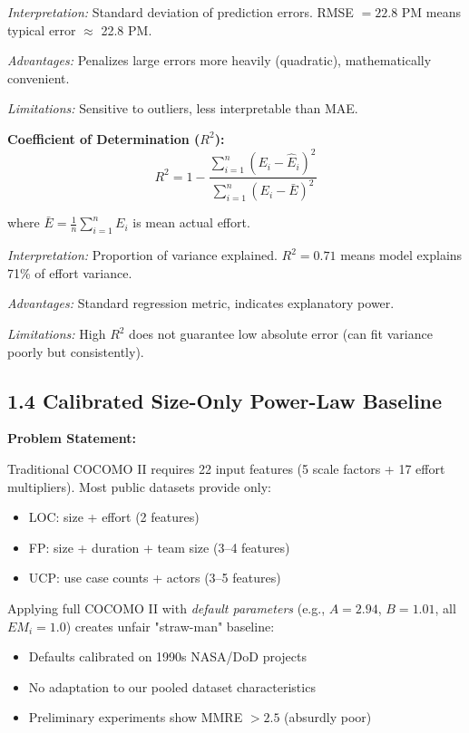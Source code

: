 \documentclass[11pt,a4paper]{article}
\begin{document}
\textit{Interpretation:} Standard deviation of prediction errors. RMSE $= 22.8$ PM means typical error $\approx$ 22.8 PM.

\textit{Advantages:} Penalizes large errors more heavily (quadratic), mathematically convenient.

\textit{Limitations:} Sensitive to outliers, less interpretable than MAE.

\textbf{Coefficient of Determination ($R^2$):}
\begin{equation}
R^2 = 1 - \frac{\sum_{i=1}^{n}(E_i - \hat{E}_i)^2}{\sum_{i=1}^{n}(E_i - \bar{E})^2}
\label{eq:r2}
\end{equation}

where $\bar{E} = \frac{1}{n}\sum_{i=1}^{n} E_i$ is mean actual effort.

\textit{Interpretation:} Proportion of variance explained. $R^2 = 0.71$ means model explains 71\% of effort variance.

\textit{Advantages:} Standard regression metric, indicates explanatory power.

\textit{Limitations:} High $R^2$ does not guarantee low absolute error (can fit variance poorly but consistently).

\subsection{1.4 Calibrated Size-Only Power-Law Baseline}
\label{sec:baseline}

\textbf{Problem Statement:}

Traditional COCOMO II requires 22 input features (5 scale factors + 17 effort multipliers). Most public datasets provide only:
\begin{itemize}
    \item LOC: size + effort (2 features)
    \item FP: size + duration + team size (3--4 features)
    \item UCP: use case counts + actors (3--5 features)
\end{itemize}

Applying full COCOMO II with \textit{default parameters} (e.g., $A = 2.94$, $B = 1.01$, all $EM_i = 1.0$) creates unfair "straw-man" baseline:
\begin{itemize}
    \item Defaults calibrated on 1990s NASA/DoD projects
    \item No adaptation to our pooled dataset characteristics
    \item Preliminary experiments show MMRE $> 2.5$ (absurdly poor)
\end{itemize}
\end{document}
